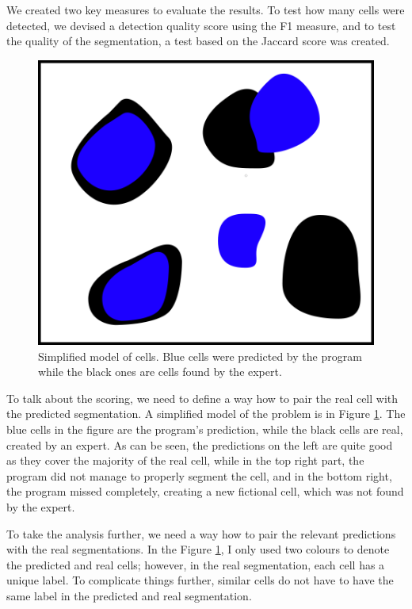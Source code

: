 \documentclass[
  digital,     %
  oneside,     %
  nosansbold,  %
  nocolorbold, %
  lof,         %
  lot,         %
]{fithesis4}
\begin{document}
We created two key measures to evaluate the results. To test how many cells were
detected, we devised a detection quality score using the F1 measure, and to test the
quality of the segmentation, a test based on the Jaccard score was created.
\begin{figure}
    \begin{center}
        \includegraphics{resources/inkscape/evaluation.png}
    \end{center}
    \caption{Simplified model of cells. Blue cells were predicted by the program
    while the black ones are cells found by the expert.}
    \label{fig:evaluation_basic}
\end{figure}
To talk about the scoring, we need to define a way how to pair the real cell
with the predicted segmentation. A simplified model of the problem is in Figure
\ref{fig:evaluation_basic}. The blue cells in the figure are the program's
prediction, while the black cells are real, created by an expert. As can be seen,
the predictions on the left are quite good as they cover the majority of the real
cell, while in the top right part, the program did not manage to properly
segment the cell, and in the bottom right, the program missed completely,
creating a new fictional cell, which was not found by the expert.

To take the analysis further, we need a way how to pair the relevant predictions
with the real segmentations. In the Figure \ref{fig:evaluation_basic}, I only used two colours
to denote the predicted and real cells; however, in the real segmentation, each
cell has a unique label. To complicate things further, similar cells do not
have to have the same label in the predicted and real segmentation.
\end{document}
